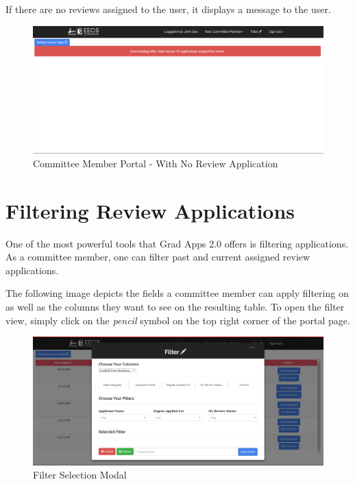 \documentclass[fontsize=12pt,paper=letter,twoside]{scrartcl}
\begin{document}
\bigskip
\noindent If there are no reviews assigned to the user, it displays a message to the user.

\begin{figure}[!htb]
\begin{center}
\includegraphics[width=.8\textwidth]{images/err_default.png}
\end{center}
\caption{Committee Member Portal - With No Review Application}
\label{fig:cm_portal_err}
\end{figure}
 
\newpage
\section{Filtering Review Applications}

One of the most powerful tools that Grad Apps 2.0 offers is filtering applications. As a committee member, one can filter past and current assigned review applications. 

\bigskip
\noindent The following image depicts the fields a committee member can apply filtering on as well as the columns they want to see on the resulting table. To open the filter view, simply click on the \emph{pencil} symbol on the top right corner of the portal page.

\begin{figure}[!htb]
\begin{center}
\includegraphics[width=.9\textwidth]{images/default_filter_view.png}
\end{center}
\caption{Filter Selection Modal}
\label{fig:def_filter_modal}
\end{figure}
\end{document}
